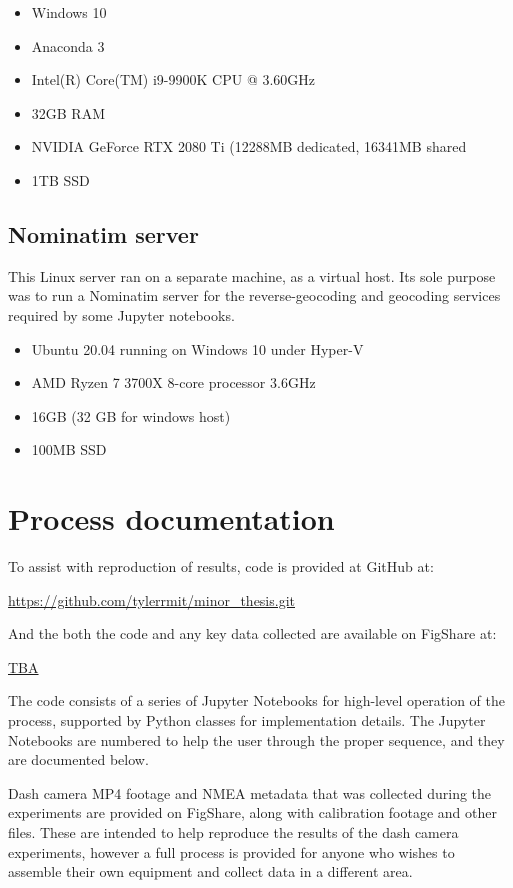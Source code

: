 \documentclass[11pt,twoside]{report}
\begin{document}
\begin{itemize}
\item{Windows 10}
\item{Anaconda 3}
\item{Intel(R) Core(TM) i9-9900K CPU @ 3.60GHz}	
\item{32GB RAM}
\item{NVIDIA GeForce RTX 2080 Ti (12288MB dedicated, 16341MB shared}
\item{1TB SSD}
\end{itemize}


\section{Nominatim server}
\label{a:nominatim}

This Linux server ran on a separate machine, as a virtual host.  Its sole purpose was to run a Nominatim server for the reverse-geocoding and geocoding services required by some Jupyter notebooks.

\begin{itemize}
\item{Ubuntu 20.04 running on Windows 10 under Hyper-V}
\item{AMD Ryzen 7 3700X 8-core processor 3.6GHz}
\item{16GB (32 GB for windows host)}
\item{100MB SSD}
\end{itemize}


\chapter{Process documentation}
\label{a:process}

To assist with reproduction of results, code is provided at GitHub at:

\url{https://github.com/tylerrmit/minor_thesis.git}

And the both the code and any key data collected are available on FigShare at:

\url{TBA}

The code consists of a series of Jupyter Notebooks for high-level operation of the process, supported by Python classes for implementation details.  The Jupyter Notebooks are numbered to help the user through the proper sequence, and they are documented below.

Dash camera MP4 footage and NMEA metadata that was collected during the experiments are provided on FigShare, along with calibration footage and other files.  These are intended to help reproduce the results of the dash camera experiments, however a full process is provided for anyone who wishes to assemble their own equipment and collect data in a different area.
\end{document}
